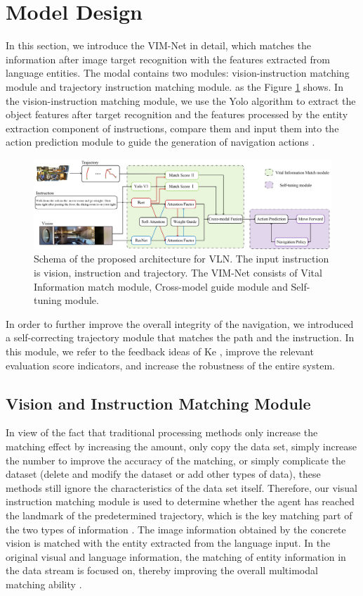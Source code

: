 \section{Model Design}
	
In this section, we introduce the VIM-Net in detail, which matches the information after image target recognition with the features extracted from language entities. The modal contains two modules: vision-instruction matching module and trajectory instruction matching module. as the Figure \ref{image03} shows. In the vision-instruction matching module, we use the Yolo algorithm to extract the object features after target recognition and the features processed by the entity extraction component of instructions, compare them and input them into the action prediction module to guide the generation of navigation actions \cite{redmon2016you}.

\begin{figure}[h]
	\centering
	\includegraphics[scale=1]{image03.png}
	\caption{Schema of the proposed architecture for VLN. The input instruction is vision, instruction and trajectory. The VIM-Net consists of Vital Information match module, Cross-model guide module and Self-tuning module.}
	\label{image03}
\end{figure}

In order to further improve the overall integrity of the navigation, we introduced a self-correcting trajectory module that matches the path and the instruction. In this module, we refer to the feedback ideas of Ke \cite{ke2019tactical}, improve the relevant evaluation score indicators, and increase the robustness of the entire system.

\subsection{Vision and Instruction Matching Module}

In view of the fact that traditional processing methods only increase the matching effect by increasing the amount, only copy the data set, simply increase the number to improve the accuracy of the matching, or simply complicate the dataset (delete and modify the dataset or add other types of data), these methods still ignore the characteristics of the data set itself. Therefore, our visual instruction matching module is used to determine whether the agent has reached the landmark of the predetermined trajectory, which is the key matching part of the two types of information \cite{vasudevan2021talk2nav}. The image information obtained by the concrete vision is matched with the entity extracted from the language input. In the original visual and language information, the matching of entity information in the data stream is focused on, thereby improving the overall multimodal matching ability \cite{zhao2021evaluation}.

